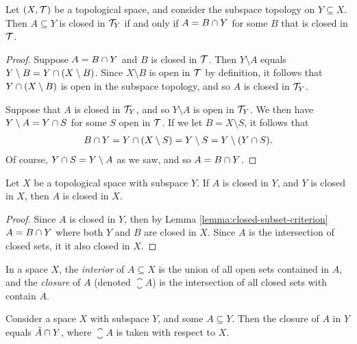 \begin{lemma}\label{lemma:closed-subset-criterion}
    Let $(X, \mathcal{T})$ be a topological space, and consider the subspace topology on $Y \subseteq X$. Then $A \subseteq Y$ is closed in $\mathcal{T}_Y$ if and only if $A = B \cap Y$ for some $B$ that is closed in $\mathcal{T}$.
\end{lemma}

\begin{proof}
    Suppose $A = B \cap Y$ and $B$ is closed in $\mathcal{T}$. Then $Y \setminus A$ equals $Y \setminus B = Y \cap (X \setminus B)$. Since $X \setminus B$ is open in $\mathcal{T}$ by definition, it follows that $Y \cap (X \setminus B)$ is open in the subspace topology, and so $A$ is closed in $\mathcal{T}_Y$.

    Suppose that $A$ is closed in $\mathcal{T}_Y$, and so $Y \setminus A$ is open in $\mathcal{T}_Y$. We then have $Y \setminus A = Y \cap S$ for some $S$ open in $\mathcal{T}$. If we let $B = X \setminus S$, it follows that
    \begin{align*}
        B \cap Y = Y \cap (X \setminus S) = Y \setminus S = Y \setminus (Y \cap S).
    \end{align*}
    Of course, $Y \cap S = Y \setminus A$ as we saw, and so $A = B \cap Y$.
\end{proof}

\begin{lemma}
    Let $X$ be a topological space with subspace $Y$. If $A$ is closed in $Y$, and $Y$ is closed in $X$, then $A$ is closed in $X$.
\end{lemma}

\begin{proof}
    Since $A$ is closed in $Y$, then by Lemma \ref{lemma:closed-subset-criterion} $A = B \cap Y$ where both $Y$ and $B$ are closed in $X$. Since $A$ is the intersection of closed sets, it it also closed in $X$.
\end{proof}

\begin{defn}
    In a space $X$, the \emph{interior} of $A \subseteq X$ is the union of all open sets contained in $A$, and the \emph{closure} of $A$ (denoted $\closure{A}$) is the intersection of all closed sets with contain $A$.
\end{defn}

\begin{thm}
    Consider a space $X$ with subspace $Y$, and some $A \subseteq Y$. Then the closure of $A$ in $Y$ equals $\bar{A} \cap Y$, where $\closure{A}$ is taken with respect to $X$.
\end{thm}


